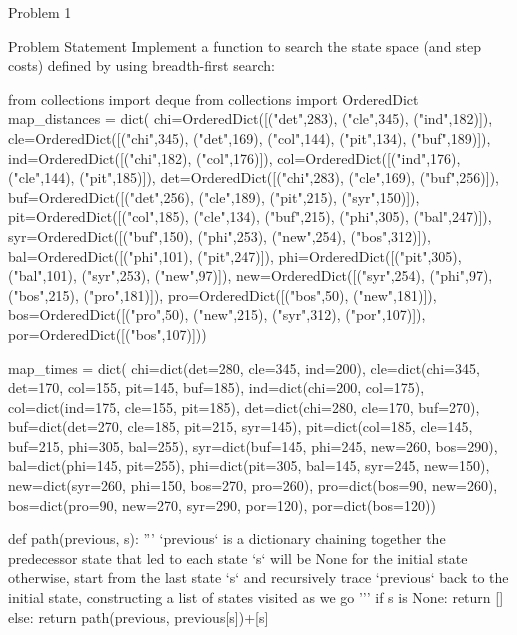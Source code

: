 \begin{problem}{Problem 1}
    \begin{statement}{Problem Statement}
        Implement a function  to search the state space (and step costs) defined by  using breadth-first search:
    \end{statement}

    \begin{highlight}[Solution]
    \begin{code}[Python]
    from collections import deque
    from collections import OrderedDict
    map_distances = dict(
        chi=OrderedDict([("det",283), ("cle",345), ("ind",182)]),
        cle=OrderedDict([("chi",345), ("det",169), ("col",144), ("pit",134), ("buf",189)]),
        ind=OrderedDict([("chi",182), ("col",176)]),
        col=OrderedDict([("ind",176), ("cle",144), ("pit",185)]),
        det=OrderedDict([("chi",283), ("cle",169), ("buf",256)]),
        buf=OrderedDict([("det",256), ("cle",189), ("pit",215), ("syr",150)]),
        pit=OrderedDict([("col",185), ("cle",134), ("buf",215), ("phi",305), ("bal",247)]),
        syr=OrderedDict([("buf",150), ("phi",253), ("new",254), ("bos",312)]),
        bal=OrderedDict([("phi",101), ("pit",247)]),
        phi=OrderedDict([("pit",305), ("bal",101), ("syr",253), ("new",97)]),
        new=OrderedDict([("syr",254), ("phi",97), ("bos",215), ("pro",181)]),
        pro=OrderedDict([("bos",50), ("new",181)]),
        bos=OrderedDict([("pro",50), ("new",215), ("syr",312), ("por",107)]),
        por=OrderedDict([("bos",107)]))
    
    map_times = dict(
        chi=dict(det=280, cle=345, ind=200),
        cle=dict(chi=345, det=170, col=155, pit=145, buf=185),
        ind=dict(chi=200, col=175),
        col=dict(ind=175, cle=155, pit=185),
        det=dict(chi=280, cle=170, buf=270),
        buf=dict(det=270, cle=185, pit=215, syr=145),
        pit=dict(col=185, cle=145, buf=215, phi=305, bal=255),
        syr=dict(buf=145, phi=245, new=260, bos=290),
        bal=dict(phi=145, pit=255),
        phi=dict(pit=305, bal=145, syr=245, new=150),
        new=dict(syr=260, phi=150, bos=270, pro=260),
        pro=dict(bos=90, new=260),
        bos=dict(pro=90, new=270, syr=290, por=120),
        por=dict(bos=120))
    
    def path(previous, s): 
        '''
        `previous` is a dictionary chaining together the predecessor state that led to each state
        `s` will be None for the initial state
        otherwise, start from the last state `s` and recursively trace `previous` back to the initial state,
        constructing a list of states visited as we go
        '''
        if s is None:
            return []
        else:
            return path(previous, previous[s])+[s]
    

\end{code}
\end{highlight}
\end{problem}

